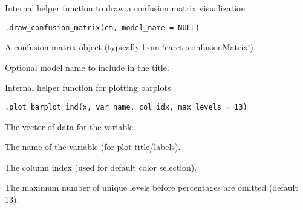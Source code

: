 \documentclass[a4paper]{book}
\begin{document}
%
\begin{Description}
Internal helper function to draw a confusion matrix visualization
\end{Description}
%
\begin{Usage}
\begin{verbatim}
.draw_confusion_matrix(cm, model_name = NULL)
\end{verbatim}
\end{Usage}
%
\begin{Arguments}
\begin{ldescription}
\item[\code{cm}] A confusion matrix object (typically from `caret::confusionMatrix`).

\item[\code{model\_name}] Optional model name to include in the title.
\end{ldescription}
\end{Arguments}
%
\begin{Description}
Internal helper function for plotting barplots
\end{Description}
%
\begin{Usage}
\begin{verbatim}
.plot_barplot_ind(x, var_name, col_idx, max_levels = 13)
\end{verbatim}
\end{Usage}
%
\begin{Arguments}
\begin{ldescription}
\item[\code{x}] The vector of data for the variable.

\item[\code{var\_name}] The name of the variable (for plot title/labels).

\item[\code{col\_idx}] The column index (used for default color selection).

\item[\code{max\_levels}] The maximum number of unique levels before percentages are omitted (default 13).
\end{ldescription}
\end{Arguments}
\end{document}
